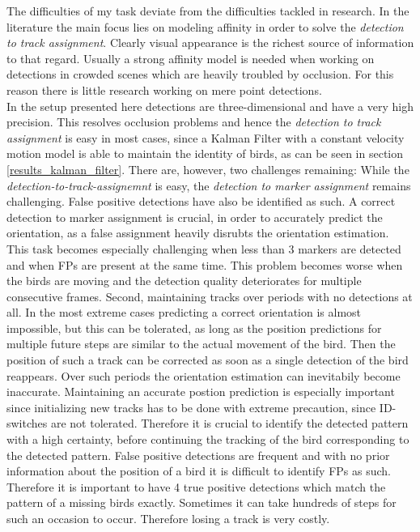 \documentclass{article}
\begin{document}
The difficulties of my task deviate from the difficulties tackled in research. In the literature the main focus lies on modeling affinity in order to solve the \emph{detection to track assignment}. Clearly visual appearance is the richest source of information to that regard. Usually a strong affinity model is needed when working on detections in crowded scenes which are heavily troubled by occlusion. For this reason there is little research working on mere point detections.\\
In the setup presented here detections are three-dimensional and have a very high precision. This resolves occlusion problems and hence the \emph{detection to track assignment} is easy in most cases, since a Kalman Filter with a constant velocity motion model is able to maintain the identity of birds, as can be seen in section \ref{results_kalman_filter}.
There are, however, two challenges remaining:
While the \emph{detection-to-track-assignemnt} is easy, the \emph{detection to marker assignment} remains challenging. False positive detections have also be identified as such. A correct detection to marker assignment is crucial, in order to accurately predict the orientation, as a false assignment heavily disrubts the orientation estimation. This task becomes especially challenging when less than 3 markers are detected and when FPs are present at the same time. This problem becomes worse when the birds are moving and the detection quality deteriorates for multiple consecutive frames.
Second, maintaining tracks over periods with no detections at all. In the most extreme cases predicting a correct orientation is almost impossible, but this can be tolerated, as long as the position predictions for multiple future steps are similar to the actual movement of the bird. Then the position of such a track can be corrected as soon as a single detection of the bird reappears. Over such periods the orientation estimation can inevitabily become inaccurate. Maintaining an accurate postion prediction is especially important since initializing new tracks has to be done with extreme precaution, since ID-switches are not tolerated. Therefore it is crucial to identify the detected pattern with a high certainty, before continuing the tracking of the bird corresponding to the detected pattern. False positive detections are frequent and with no prior information about the position of a bird it is difficult to identify FPs as such. Therefore it is important to have 4 true positive detections which match  the pattern of a missing birds exactly. Sometimes it can take hundreds of steps for such an occasion to occur. Therefore losing a track is very costly. %
\end{document}
